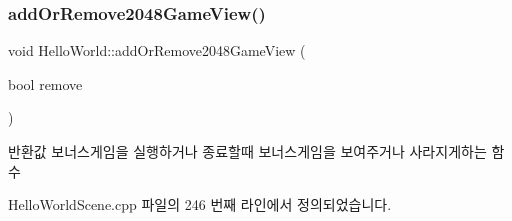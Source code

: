\subsubsection{\texorpdfstring{add\+Or\+Remove2048\+Game\+View()}{addOrRemove2048GameView()}}
{\footnotesize\ttfamily void Hello\+World\+::add\+Or\+Remove2048\+Game\+View (\begin{DoxyParamCaption}\item[{bool}]{remove }\end{DoxyParamCaption})\hspace{0.3cm}{\ttfamily [protected]}}

\begin{DoxyReturn}{반환값}
보너스게임을 실행하거나 종료할때 보너스게임을 보여주거나 사라지게하는 함수 
\end{DoxyReturn}


Hello\+World\+Scene.\+cpp 파일의 246 번째 라인에서 정의되었습니다.



